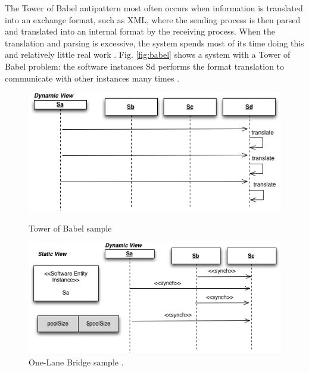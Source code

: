 \documentclass[espaco=umemeio,chapter=TITLE,twoside,openright]{abnt}
\begin{document}
The Tower of Babel antipattern most often occurs when information is translated into an exchange format, such as XML, where the sending process is then parsed and translated into an
internal format by the receiving process. When the translation and parsing is excessive, the system spends most
of its time doing this and relatively little real work \cite{Smith2003}. Fig. \ref{fig:babel} shows a system with a Tower of Babel problem: the software instances Sd performs the format translation to communicate with other instances many times \cite{Vetoio2011}.

\begin{figure}[H]
\begin{minipage}{.5\textwidth}
\centering
\includegraphics[width=1\textwidth]{./images/babel2.png}
\caption{Tower of Babel sample \cite{Vetoio2011}}
\label{fig:babel}
\end{minipage}
\begin{minipage}{.5\textwidth}
\centering
\includegraphics[width=1\textwidth]{./images/onelane.png}
\caption{One-Lane Bridge sample \cite{Vetoio2011}.}
\label{fig:onelane}
\end{minipage}
\end{figure}
\end{document}
